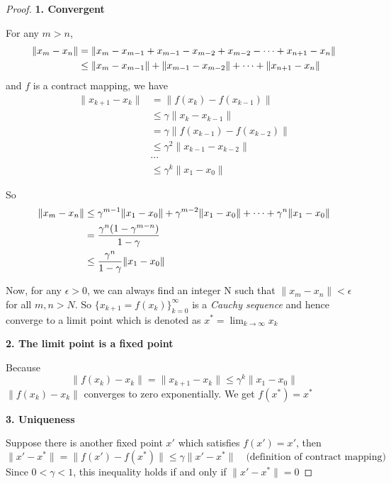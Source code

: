 \begin{proof}
    \textbf{1. Convergent} \par
    For any $m>n$,
    \begin{align*}
        \|x_m-x_n\| &= \|x_m-x_{m-1}+x_{m-1}-x_{m-2}+x_{m-2}-\cdots +x_{n+1}-x_n\| \notag \\
        &\le \|x_m-x_{m-1}\| +\|x_{m-1}-x_{m-2}\| +\cdots +\|x_{n+1}-x_n\| \notag \\
    \end{align*}
    and $f$ is a contract mapping, we have
    \begin{align*}
        \|x_{k+1}-x_k\| &= \|f(x_k)-f(x_{k-1})\| \\
                        &\le \gamma \|x_k-x_{k-1}\| \\
                        &= \gamma \|f(x_{k-1})-f(x_{k-2})\| \\
                        &\le \gamma ^2 \|x_{k-1}-x_{k-2}\| \\
                        &\cdots \\
                        &\le \gamma ^k \|x_1-x_0\|
    \end{align*}

    So 
    \begin{align}
        \|x_m-x_n\| &\le \gamma ^{m-1}\|x_1-x_0\| + \gamma^{m-2}\|x_1-x_0\|+\cdots +\gamma^{n}\|x_1-x_0\| \notag \\
                    &= \frac{\gamma ^{n}(1-\gamma^{m-n})}{1-\gamma } \notag \\
                    &\le \frac{\gamma ^{n}}{1-\gamma }\|x_1-x_0\|
    \end{align}

    Now, for any $\epsilon>0$, we can always find an integer N such that $\|x_{m}-x_{n}\|<\epsilon$ for all $m,n>N$. So
    $\{x_{k+1}=f(x_k)\}_{k=0}^{\infty}$ is a \emph{Cauchy sequence} and hence converge to a limit point which is denoted as $x^*=\lim_{k\to \infty}x_k$ \newline

    \textbf{2. The limit point is a fixed point} \par
    Because
    \begin{equation*}
        \|f(x_k)-x_k\| = \|x_{k+1}-x_k\| \le \gamma ^k\|x_1-x_0\|
    \end{equation*}
    $\|f(x_{k})-x_{k}\|$ converges to zero exponentially. We get $f(x^{*})=x^*$ \newline

    \textbf{3. Uniqueness} \par
    Suppose there is another fixed point $x'$ which satisfies $f(x')=x'$, then
    \begin{equation}
        \|x'-x^*\|=\|f(x')-f(x^*)\|\le \gamma \|x'-x^*\| \quad \text{(definition of contract mapping)}
    \end{equation}
    Since $0<\gamma<1$, this inequality holds if and only if $\|x' -x^*\|=0$
\end{proof}

